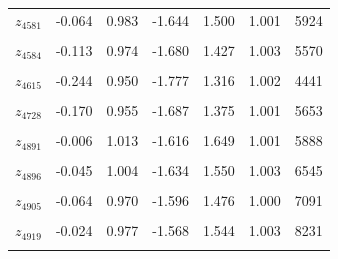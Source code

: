 \begin{longtable}{lrrrrrr}
$z_{4581}$ & -0.064 & 0.983 & -1.644 & 1.500 & 1.001 & 5924\\
\cellcolor{gray!10}{$z_{4583}$} & \cellcolor{gray!10}{-0.035} & \cellcolor{gray!10}{0.956} & \cellcolor{gray!10}{-1.565} & \cellcolor{gray!10}{1.462} & \cellcolor{gray!10}{1.000} & \cellcolor{gray!10}{5232}\\
$z_{4584}$ & -0.113 & 0.974 & -1.680 & 1.427 & 1.003 & 5570\\
\cellcolor{gray!10}{$z_{4586}$} & \cellcolor{gray!10}{0.191} & \cellcolor{gray!10}{0.947} & \cellcolor{gray!10}{-1.316} & \cellcolor{gray!10}{1.707} & \cellcolor{gray!10}{1.002} & \cellcolor{gray!10}{4744}\\
$z_{4615}$ & -0.244 & 0.950 & -1.777 & 1.316 & 1.002 & 4441\\
\cellcolor{gray!10}{$z_{4721}$} & \cellcolor{gray!10}{0.471} & \cellcolor{gray!10}{1.001} & \cellcolor{gray!10}{-1.141} & \cellcolor{gray!10}{2.046} & \cellcolor{gray!10}{1.001} & \cellcolor{gray!10}{2926}\\
$z_{4728}$ & -0.170 & 0.955 & -1.687 & 1.375 & 1.001 & 5653\\
\cellcolor{gray!10}{$z_{4885}$} & \cellcolor{gray!10}{-0.032} & \cellcolor{gray!10}{1.002} & \cellcolor{gray!10}{-1.624} & \cellcolor{gray!10}{1.531} & \cellcolor{gray!10}{1.002} & \cellcolor{gray!10}{7513}\\
$z_{4891}$ & -0.006 & 1.013 & -1.616 & 1.649 & 1.001 & 5888\\
\cellcolor{gray!10}{$z_{4892}$} & \cellcolor{gray!10}{-0.024} & \cellcolor{gray!10}{0.974} & \cellcolor{gray!10}{-1.565} & \cellcolor{gray!10}{1.547} & \cellcolor{gray!10}{1.000} & \cellcolor{gray!10}{6460}\\
$z_{4896}$ & -0.045 & 1.004 & -1.634 & 1.550 & 1.003 & 6545\\
\cellcolor{gray!10}{$z_{4902}$} & \cellcolor{gray!10}{-0.029} & \cellcolor{gray!10}{0.970} & \cellcolor{gray!10}{-1.570} & \cellcolor{gray!10}{1.529} & \cellcolor{gray!10}{1.005} & \cellcolor{gray!10}{6185}\\
$z_{4905}$ & -0.064 & 0.970 & -1.596 & 1.476 & 1.000 & 7091\\
\cellcolor{gray!10}{$z_{4912}$} & \cellcolor{gray!10}{-0.044} & \cellcolor{gray!10}{0.981} & \cellcolor{gray!10}{-1.609} & \cellcolor{gray!10}{1.490} & \cellcolor{gray!10}{1.001} & \cellcolor{gray!10}{6771}\\
$z_{4919}$ & -0.024 & 0.977 & -1.568 & 1.544 & 1.003 & 8231\\
\cellcolor{gray!10}{$z_{4920}$} & \cellcolor{gray!10}{-0.046} & \cellcolor{gray!10}{0.986} & \cellcolor{gray!10}{-1.645} & \cellcolor{gray!10}{1.503} & \cellcolor{gray!10}{1.005} & \cellcolor{gray!10}{6605}\\

\end{longtable}
